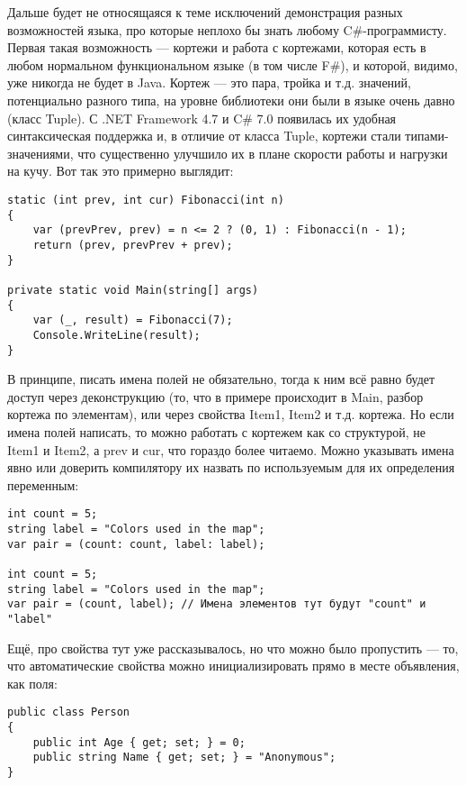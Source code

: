 \documentclass[a5paper]{article}
\begin{document}
Дальше будет не относящаяся к теме исключений демонстрация разных возможностей языка, про которые неплохо бы знать любому C\#-программисту. Первая такая возможность --- кортежи и работа с кортежами, которая есть в любом нормальном функциональном языке (в том числе F\#), и которой, видимо, уже никогда не будет в Java. Кортеж --- это пара, тройка и т.д. значений, потенциально разного типа, на уровне библиотеки они были в языке очень давно (класс Tuple). С .NET Framework 4.7 и C\# 7.0 появилась их удобная синтаксическая поддержка и, в отличие от класса Tuple, кортежи стали типами-значениями, что существенно улучшило их в плане скорости работы и нагрузки на кучу. Вот так это примерно выглядит:

\begin{verbatim}
static (int prev, int cur) Fibonacci(int n)
{
    var (prevPrev, prev) = n <= 2 ? (0, 1) : Fibonacci(n - 1);
    return (prev, prevPrev + prev);
}

private static void Main(string[] args)
{
    var (_, result) = Fibonacci(7);
    Console.WriteLine(result);
}
\end{verbatim}

В принципе, писать имена полей не обязательно, тогда к ним всё равно будет доступ через деконструкцию (то, что в примере происходит в Main, разбор кортежа по элементам), или через свойства Item1, Item2 и т.д. кортежа. Но если имена полей написать, то можно работать с кортежем как со структурой, не Item1 и Item2, а prev и cur, что гораздо более читаемо. Можно указывать имена явно или доверить компилятору их назвать по используемым для их определения переменным:

\begin{verbatim}
int count = 5;
string label = "Colors used in the map";
var pair = (count: count, label: label);

int count = 5;
string label = "Colors used in the map";
var pair = (count, label); // Имена элементов тут будут "count" и "label"
\end{verbatim}

Ещё, про свойства тут уже рассказывалось, но что можно было пропустить --- то, что автоматические свойства можно инициализировать прямо в месте объявления, как поля:

\begin{verbatim}
public class Person
{
    public int Age { get; set; } = 0;
    public string Name { get; set; } = "Anonymous";
}
\end{verbatim}
\end{document}
